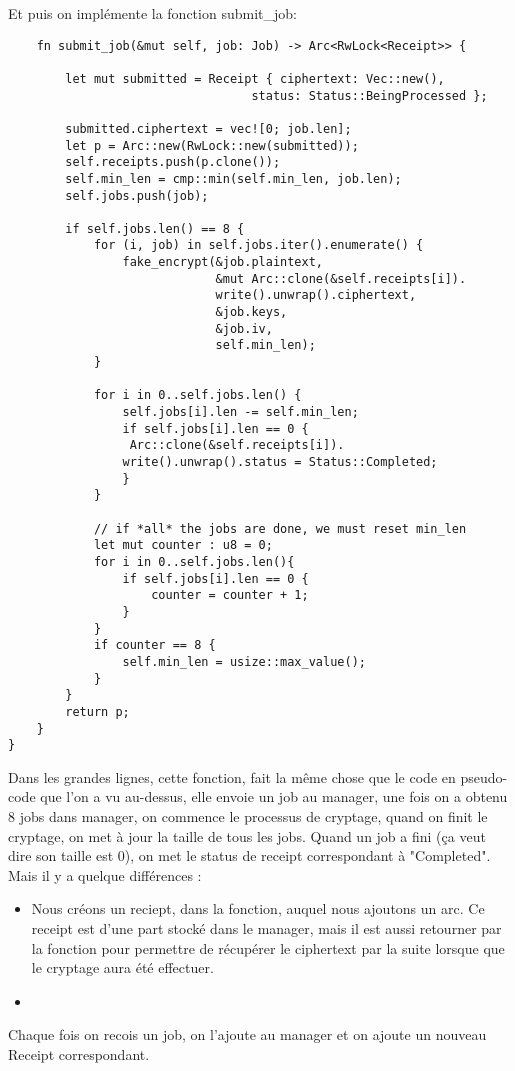 \documentclass{article}
\begin{document}
Et puis on implémente la fonction submit\_job:
\begin{lstlisting}
    fn submit_job(&mut self, job: Job) -> Arc<RwLock<Receipt>> {

        let mut submitted = Receipt { ciphertext: Vec::new(),
                                  status: Status::BeingProcessed };

        submitted.ciphertext = vec![0; job.len];
        let p = Arc::new(RwLock::new(submitted));
        self.receipts.push(p.clone());
        self.min_len = cmp::min(self.min_len, job.len);
        self.jobs.push(job);

        if self.jobs.len() == 8 {
            for (i, job) in self.jobs.iter().enumerate() {
                fake_encrypt(&job.plaintext,
                             &mut Arc::clone(&self.receipts[i]).
                             write().unwrap().ciphertext,
                             &job.keys,
                             &job.iv,
                             self.min_len);
            }

            for i in 0..self.jobs.len() {
                self.jobs[i].len -= self.min_len;
                if self.jobs[i].len == 0 {
                 Arc::clone(&self.receipts[i]).
                write().unwrap().status = Status::Completed;
                }
            }

            // if *all* the jobs are done, we must reset min_len
            let mut counter : u8 = 0;
            for i in 0..self.jobs.len(){
                if self.jobs[i].len == 0 {
                    counter = counter + 1;
                }
            }
            if counter == 8 {
                self.min_len = usize::max_value();
            }
        }
        return p;
    }
}
\end{lstlisting}
Dans les grandes lignes, cette fonction, fait la même chose que le code en pseudo-code que l'on a vu au-dessus, elle envoie un job au manager, une fois on a obtenu 8 jobs dans manager, on commence le processus de cryptage, quand on finit le cryptage, on met à jour la taille de tous les jobs. Quand un job a fini (ça veut dire son taille est 0), on met le status de receipt correspondant à "Completed".\\
Mais il y a quelque différences :
\begin{itemize}
    \item Nous créons un reciept, dans la fonction, auquel nous ajoutons un arc. Ce receipt est d'une part stocké dans le manager, mais il est aussi retourner par la fonction pour permettre de récupérer le ciphertext par la suite lorsque que le cryptage aura été effectuer.
    \item 
\end{itemize}
Chaque fois on recois un job, on l'ajoute au manager et on ajoute un nouveau Receipt correspondant.
\end{document}
